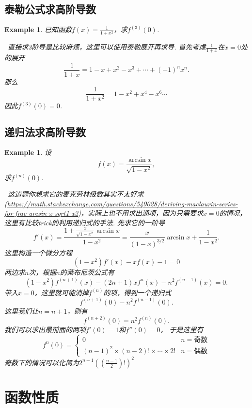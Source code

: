 \documentclass{article}
\newtheorem{example}[theorem]{Example}
\newcommand{\hints}{{\color{blue} \text{hints}}}
\begin{document}
\subsection{泰勒公式求高阶导数}

\begin{example}
\rm 已知函数$f(x)=\frac{1}{1+x^2}$，求$f^{(3)}(0)$.

\hints\ 直接求3阶导是比较麻烦，这里可以使用泰勒展开再求导. 首先考虑$\frac{1}{1+x}$在$x=0$处的展开
$$
\frac{1}{1+x} = 1 - x + x^2 - x^3 + \cdots + (-1)^n x^n.
$$
那么
$$
\frac{1}{1+x^2} = 1 - x^2 + x^4 - x^6 \cdots 
$$
因此$f^{(3)}(0) = 0$. 
\end{example}

\subsection{递归法求高阶导数}

\begin{example}
\rm 设
$$
f(x) = \frac{\arcsin x}{\sqrt{1-x^2}},
$$
求$f^{(n)}(0)$.

\hints\ 这道题你想求它的麦克劳林级数其实不太好求(\url{https://math.stackexchange.com/questions/549028/deriving-maclaurin-series-for-frac-arcsin-x-sqrt1-x2})，实际上也不用求出通项，因为只需要求$x=0$的情况，这里有比较trick的利用递归式的手法. 先求它的一阶导
$$
f'(x) = \frac{1 + \frac{x}{\sqrt{1-x^2}}\arcsin x}{1-x^2} = \frac{x}{(1-x)^{3/2}}\arcsin x + \frac{1}{1-x^2}.  
$$
这里构造一个微分方程
$$
(1-x^2)f'(x)-xf(x)-1 = 0
$$ 
两边求$n$次，根据$n$的莱布尼茨公式有
$$
(1-x^2)f^{(n+1)}(x) - (2n+1)xf^{n}(x)-n^2f^{(n-1)}(x) = 0. 
$$
带入$x=0$，这里就可能消掉$f^{(n)}$的项，得到一个递归式
$$
f^{(n+1)}(0) - n^2f^{(n-1)}(0). 
$$
这里我们让$n=n+1$，则有
$$
f^{(n+2)}(0) =  n^2f^{(n)}(0). 
$$
我们可以求出最前面的两项$f'(0) = 1$和$f''(0) = 0$， 于是这里有
$$
f^{n}(0) = \left\{ \begin{array}{ll}
0 & n=\text{奇数} \\
(n-1)^2\times(n-2)!\times\cdots\times 2! &   n=\text{偶数}
\end{array} \right.
$$
奇数下的情况可以化简为$2^{n-1}((\frac{n-1}{2})!)^2$
\end{example}

\newpage
\section{函数性质}
\end{document}
